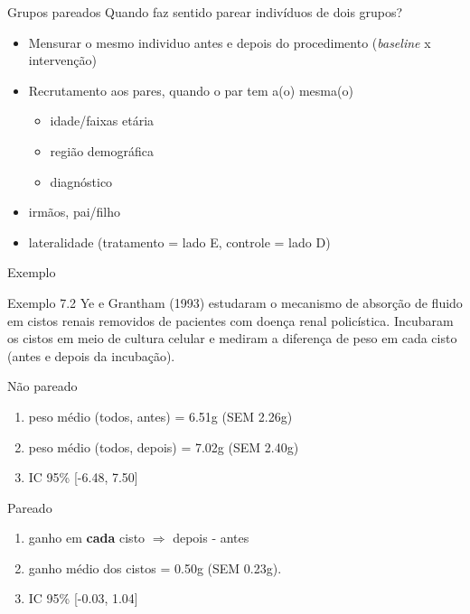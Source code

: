 \documentclass{beamer}
\begin{document}
\begin{frame}{Grupos pareados}
Quando faz sentido parear indivíduos de dois grupos?
  \begin{itemize}
  \item Mensurar o \alert{mesmo} individuo antes e depois do procedimento ({\em baseline} x intervenção)
  \item Recrutamento aos pares, quando o par tem a(o) mesma(o)
    \begin{itemize}
    \item idade/faixas etária
    \item região demográfica
    \item diagnóstico
    \end{itemize}
  \item irmãos, pai/filho
  \item lateralidade (tratamento = lado E, controle = lado D)
  \end{itemize}
\end{frame}

\begin{frame}{Exemplo}
  \begin{exampleblock}{Exemplo 7.2}
    \footnotesize
    Ye e Grantham (1993) estudaram o mecanismo de absorção de fluido em cistos renais removidos de pacientes com doença renal policística.
    Incubaram os cistos em meio de cultura celular e mediram a diferença de peso em cada cisto (antes e depois da incubação).

    \scriptsize
    \begin{exampleblock}{Não pareado}
      \begin{enumerate}
      \item<2,4> peso médio (todos, antes) = 6.51g (SEM 2.26g)
      \item<2,4> peso médio (todos, depois) = 7.02g (SEM 2.40g)
      \item<2,4> IC 95\% [-6.48, 7.50]
      \end{enumerate}
    \end{exampleblock}
    \begin{exampleblock}{Pareado}
      \begin{enumerate}
      \item<3,4> ganho em {\bf cada} cisto $\Rightarrow$ depois - antes
      \item<3,4> ganho médio dos cistos = 0.50g (SEM 0.23g).
      \item<3,4> IC 95\% [-0.03, 1.04]
      \end{enumerate}
    \end{exampleblock}
  \end{exampleblock}
\end{frame}
\end{document}
